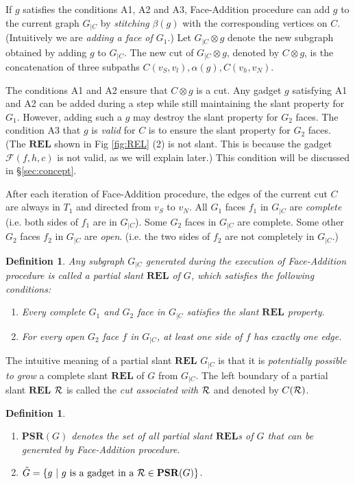 \documentclass[11pt]{article}
\newcommand{\R}{{\cal R}}
\newcommand{\FF}{\mathcal{F}}
\newcommand{\REL}{\mathbf{REL}}
\newcommand{\PSR}{\mathbf{PSR}}
\newtheorem{definition}[figure]{Definition}
\begin{document}
If $g$ satisfies the conditions A1, A2 and A3, Face-Addition
procedure can add $g$ to the current graph $G_{|C}$ by {\em stitching}
$\beta(g)$ with the corresponding vertices on $C$. (Intuitively we are
{\em adding a face of $G_1$}.) Let $G_{|C} \otimes g$ denote the new subgraph
obtained by adding $g$ to $G_{|C}$. The new cut of $G_{|C} \otimes g$,
denoted by $C\otimes g$, is the concatenation of three subpaths
$C(v_S, v_l), \alpha(g), C(v_h, v_N)$.

The conditions A1 and A2 ensure that $C \otimes g$ is a cut. Any gadget
$g$ satisfying A1 and A2 can be added during a step while still maintaining
the slant property for $G_1$. However, adding such a $g$ may destroy the
slant property for $G_2$ faces. The condition A3 that $g$ is {\em valid}
for $C$ is to ensure the slant property for $G_2$ faces. (The $\REL$
shown in Fig \ref{fig:REL} (2) is not slant. This is because the gadget
$\FF(f,h,c)$ is not valid, as we will explain later.)
This condition will be discussed in \S \ref{sec:concept}.

After each iteration of Face-Addition procedure, the edges of
the current cut $C$ are always in $T_1$ and directed from $v_S$
to $v_N$. All $G_1$ faces $f_1$ in $G_{|C}$ are {\em complete}
(i.e. both sides of $f_1$ are in $G_{|C}$). Some $G_2$ faces in
$G_{|C}$ are complete. Some other $G_2$ faces $f_2$ in $G_{|C}$ are
{\em open}. (i.e. the two sides of $f_2$ are not completely in $G_{|C}$.)

\begin{definition}
Any subgraph $G_{|C}$ generated during the execution of
Face-Addition procedure is called a {\em partial slant}
$\REL$ of $G$, which satisfies the following conditions:
\begin{enumerate}
\item Every complete $G_1$ and $G_2$ face in $G_{|C}$ satisfies
the slant $\REL$ property.
\item For every open $G_2$ face $f$ in $G_{|C}$, at least one
side of $f$ has exactly one edge.
\end{enumerate}
\end{definition}

The intuitive meaning of a partial slant $\REL$ $G_{|C}$ is that it is
{\em potentially possible to grow} a complete slant $\REL$ of $G$ from
$G_{|C}$. The left boundary of a partial slant $\REL$ $\R$ is called
the {\em cut associated with} $\R$ and denoted by $C(\R)$.

\begin{definition}
\label{def:G-tilde}
\begin{enumerate}
\item $\PSR(G)$ denotes the set of all partial slant $\REL$s of $G$
that can be generated by Face-Addition procedure.
\item $\tilde{G} = \{ g~|~g \mbox{ is a gadget in a } \R \in \PSR(G)\}$.
\end{enumerate}
\end{definition}
\end{document}
